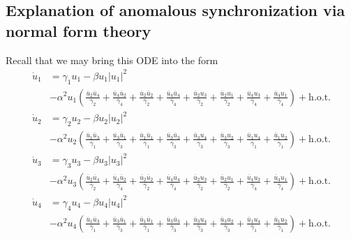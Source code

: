 \documentclass[12pt]{article}
\theoremstyle{plain}
\theoremstyle{definition}
\theoremstyle{remark}
\theoremstyle{remark}
\begin{document}
\subsection{Explanation of anomalous synchronization via normal form theory}

Recall that we may bring this ODE into the form
\begin{align}\label{repeattt1}
\dot{u}_1 &= \gamma_1u_1 - \beta u_1|u_1|^2 \\ \nonumber
&- \alpha^2 u_1 \left(\frac{\overline{u}_2\overline{u}_4}{\overline{\gamma}_2} + \frac{\overline{u}_4\overline{u}_2}{\overline{\gamma}_4} + \frac{\overline{u}_2\overline{u}_2}{\overline{\gamma}_2} + \frac{\overline{u}_4\overline{u}_4}{\overline{\gamma}_4} + \frac{\overline{u}_2u_3}{\overline{\gamma}_2} + \frac{\overline{u}_2u_1}{\overline{\gamma}_2} + 
\frac{\overline{u}_4u_3}{\overline{\gamma}_4} +
\frac{\overline{u}_4u_1}{\overline{\gamma}_4} \right) + \text{h.o.t.}\\ \nonumber
\dot{u}_2 &= \gamma_2u_2 - \beta u_2|u_2|^2 \\ \nonumber
&- \alpha^2 u_2 \left(\frac{\overline{u}_1\overline{u}_3}{\overline{\gamma}_1} + \frac{\overline{u}_3\overline{u}_1}{\overline{\gamma}_3} + \frac{\overline{u}_1\overline{u}_1}{\overline{\gamma}_1} + \frac{\overline{u}_3\overline{u}_3}{\overline{\gamma}_3} + \frac{\overline{u}_3u_4}{\overline{\gamma}_3} + \frac{\overline{u}_3u_2}{\overline{\gamma}_3} + 
\frac{\overline{u}_1u_4}{\overline{\gamma}_1} +
\frac{\overline{u}_1u_2}{\overline{\gamma}_1} \right) + \text{h.o.t.}\\ \nonumber
\dot{u}_3 &= \gamma_3u_3 - \beta u_3|u_3|^2 \\ \nonumber
&- \alpha^2 u_3 \left(\frac{\overline{u}_2\overline{u}_4}{\overline{\gamma}_2} + \frac{\overline{u}_4\overline{u}_2}{\overline{\gamma}_4} + \frac{\overline{u}_2\overline{u}_2}{\overline{\gamma}_2} + \frac{\overline{u}_4\overline{u}_4}{\overline{\gamma}_4} + \frac{\overline{u}_2u_3}{\overline{\gamma}_2} + \frac{\overline{u}_2u_1}{\overline{\gamma}_2} + 
\frac{\overline{u}_4u_3}{\overline{\gamma}_4} +
\frac{\overline{u}_4u_1}{\overline{\gamma}_4} \right) + \text{h.o.t.}\\ \nonumber
\dot{u}_4 &= \gamma_4u_4 - \beta u_4|u_4|^2 \\ \nonumber
&- \alpha^2 u_4 \left(\frac{\overline{u}_1\overline{u}_3}{\overline{\gamma}_1} + \frac{\overline{u}_3\overline{u}_1}{\overline{\gamma}_3} + \frac{\overline{u}_1\overline{u}_1}{\overline{\gamma}_1} + \frac{\overline{u}_3\overline{u}_3}{\overline{\gamma}_3} + \frac{\overline{u}_3u_4}{\overline{\gamma}_3} + \frac{\overline{u}_3u_2}{\overline{\gamma}_3} + 
\frac{\overline{u}_1u_4}{\overline{\gamma}_1} +
\frac{\overline{u}_1u_2}{\overline{\gamma}_1} \right) + \text{h.o.t.} 
\end{align}
\end{document}
